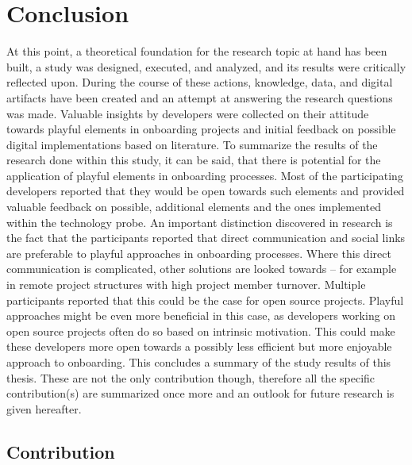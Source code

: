 \section{Conclusion}

At this point, a theoretical foundation for the research topic at hand has been built, a study was designed, executed, and analyzed, and its results were critically reflected upon. During the course of these actions, knowledge, data, and digital artifacts have been created and an attempt at answering the research questions was made. Valuable insights by developers were collected on their attitude towards playful elements in onboarding projects and initial feedback on possible digital implementations based on literature. To summarize the results of the research done within this study, it can be said, that there is potential for the application of playful elements in onboarding processes. Most of the participating developers reported that they would be open towards such elements and provided valuable feedback on possible, additional elements and the ones implemented within the technology probe. An important distinction discovered in research is the fact that the participants reported that direct communication and social links are preferable to playful approaches in onboarding processes. Where this direct communication is complicated, other solutions are looked towards -- for example in remote project structures with high project member turnover. Multiple participants reported that this could be the case for open source projects. Playful approaches might be even more beneficial in this case, as developers working on open source projects often do so based on intrinsic motivation. This could make these developers more open towards a possibly less efficient but more enjoyable approach to onboarding. This concludes a summary of the study results of this thesis. These are not the only contribution though, therefore all the specific contribution(s) are summarized once more and an outlook for future research is given hereafter.

\subsection{Contribution}

